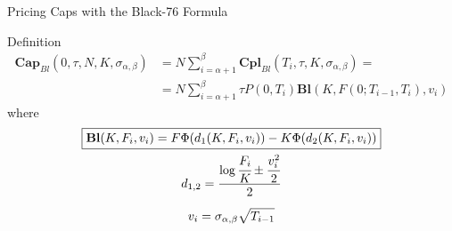 \documentclass{beamer}
\begin{document}
%		
%
%
%
%

\begin{frame}{Pricing Caps with the Black-76 Formula}
	\begin{block}{Definition}
	\begin{equation}
		\begin{aligned}
		\textbf{Cap}_{Bl}(0, \tau,N,K,\sigma_{\alpha,\beta}) &= N\sum_{i=\alpha+1}^{\beta}\textbf{Cpl}_{Bl}(T_i, \tau,K,\sigma_{\alpha,\beta}) = \\ &=N\sum_{i=\alpha+1}^{\beta}\tau P(0,T_i) \textbf{Bl}(K,F(0;T_{i-1},T_i),v_i)
		\end{aligned}
		\label{eq:cap_black}
	\end{equation}
	where
	\begin{equation*}
		\begin{gathered}
			\boxed{\textbf{Bl}(K,F_i,v_i)=F\Phi(d_1(K,F_i,v_i)) - K\Phi(d_2(K,F_i,v_i))} \\
			d_{1,2} = \frac{\log{\cfrac{F_i}{K}} \pm \cfrac{v_i^2}{2}}{2} \\[0.2cm]
			v_i = \sigma_{\alpha,\beta}\sqrt{T_{i-1}}
		\end{gathered}
	\end{equation*}
	\end{block}
\end{frame}
\end{document}
